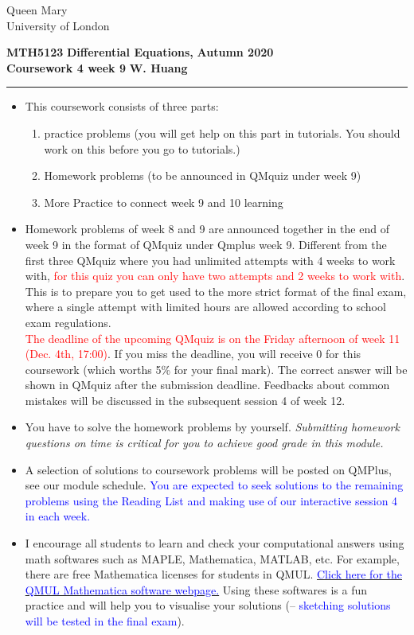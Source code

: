\documentclass[11pt,a4paper]{article}
\begin{document}
	\begin{singlespace}
		\begin{center}
			\Huge Queen Mary\\
			\LARGE University of London
		\end{center}
		\Large \textbf{MTH5123} \hfill \Large \textbf{Differential Equations,} \hfill \Large \textbf{Autumn 2020}\\
		\large \textbf{Coursework 4 week 9} \hfill \large \textbf{W. Huang}
    \rule{\textwidth}{0.4pt}
	\end{singlespace}
	\begin{itemize}
		\item This coursework consists of three parts:
		\begin{enumerate}[\bfseries I.]
			\item practice problems (you will get help on this part in tutorials. You should work on this before you go to tutorials.)
			\item Homework problems (to be announced in QMquiz under week 9)
			\item More Practice to connect week 9 and 10 learning
		\end{enumerate}
		\item Homework problems of week 8 and 9 are announced together in the end of week 9 in the format of QMquiz under Qmplus week 9. Different from the first three QMquiz where you had unlimited attempts with 4 weeks to work with, \textcolor{red}{for this quiz you can only have two attempts and 2 weeks to work with}. This is to prepare you to get used to the more strict format of the final exam, where a single attempt with limited hours are allowed according to school exam regulations.\\
		\textcolor{red}{The deadline of the upcoming QMquiz is on the Friday afternoon of week 11 (Dec. 4th, 17:00)}. If you miss the deadline, you will receive 0 for this coursework (which worths 5\% for your final mark). The correct answer will be shown in QMquiz after the submission deadline. Feedbacks about common mistakes will be discussed in the subsequent session 4 of week 12.
		\item You have to solve the homework problems by yourself. \textit{Submitting homework questions on time is critical for you to achieve good grade in this module.}
		\item A selection of solutions to coursework problems will be posted on QMPlus, see our module schedule. \textcolor{blue}{You are expected to seek solutions to the remaining problems using the Reading List and making use of our interactive session 4 in each week.}
		\item I encourage all students to learn and check your computational answers using math softwares such as MAPLE, Mathematica, MATLAB, etc. For example, there are free Mathematica licenses for students in QMUL. \href{https://www.its.qmul.ac.uk/services/service-catalogue/items/software---computational-mathematica.html}{\textcolor{blue}{Click here for the QMUL Mathematica software webpage.}} Using these softwares is a fun practice and will help you to visualise your solutions (– \textcolor{blue}{sketching solutions will be tested in the final exam}).
	\end{itemize}
\end{document}
